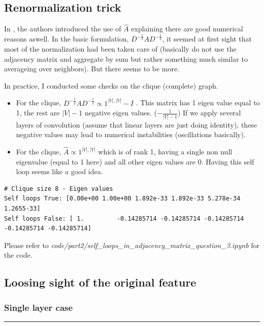 \documentclass[a4paper]{article}
\begin{document}
\subsection*{Renormalization trick}
In \cite{kipf2017semisupervised}, the authors introduced the use of $\hat{A}$ explaining there are good numerical 
reasons aswell. In the basic formulation, $D^{-\frac{1}{2}} A D^{-\frac{1}{2}}$, it seemed at first sight that most of the normalization had been taken
care of (basically do not use the adjacency matrix and aggregate by sum but rather something much similar to averageing over neighbors). But there seems to be more.

In practice, I conducted some checks on the clique (complete) graph.
\begin{itemize}
    \item For the clique, $D^{-\frac{1}{2}} A D^{-\frac{1}{2}} \propto 1^{|V|, |V|} - I$ . 
        \subitem This matrix has 1 eigen value equal to 1, the rest are $|V|-1$ negative eigen values. ($-\frac{1}{|V|-1}$)
        \subitem If we apply several layers of convolution (assume that linear layers are just doing identity), these negative values may lead 
        to numerical instabilities (oscillations basically).
    \item For the clique, $\hat{A} \propto 1^{|V|, |V|}$ which is of rank 1, having a single non null eigenvalue (equal to 1 here) and all other eigen values are 0. Having this self loop seems like a good idea.
\end{itemize}


\begin{verbatim}
# Clique size 8 - Eigen values
Self loops True: [0.00e+00 1.00e+00 1.892e-33 1.892e-33 5.278e-34 1.2655-33]
Self loops False: [ 1.         -0.14285714 -0.14285714 -0.14285714 -0.14285714 -0.14285714]
\end{verbatim}

Please refer to \textit{code/part2/self\_loops\_in\_adjacency\_matrix\_question\_3.ipynb} for the code.
\subsection*{Loosing sight of the original feature}
\subsubsection*{Single layer case}
\hrule
\end{document}
